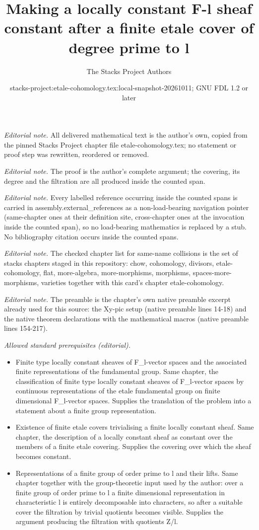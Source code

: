 \documentclass[10pt,a4paper]{amsart}
\title{Making a locally constant F-l sheaf constant after a finite etale cover of degree prime to l}
\author{The Stacks Project Authors}
\date{stacks-project:etale-cohomology.tex:local-snapshot-20261011; GNU FDL 1.2 or later}
\theoremstyle{plain}
\theoremstyle{definition}
\theoremstyle{remark}
\numberwithin{equation}{subsection}
\begin{document}
\maketitle
\noindent\textit{Editorial note.} All delivered mathematical text is the author's own, copied from the pinned Stacks Project chapter file etale-cohomology.tex; no statement or proof step was rewritten, reordered or removed.\par\medskip
\noindent\textit{Editorial note.} The proof is the author's complete argument; the covering, its degree and the filtration are all produced inside the counted span.\par\medskip
\noindent\textit{Editorial note.} Every labelled reference occurring inside the counted spans is carried in assembly.external\_references as a non-load-bearing navigation pointer (same-chapter ones at their definition site, cross-chapter ones at the invocation inside the counted span), so no load-bearing mathematics is replaced by a stub. No bibliography citation occurs inside the counted spans.\par\medskip
\noindent\textit{Editorial note.} The checked chapter list for same-name collisions is the set of stacks chapters staged in this repository: chow, cohomology, divisors, etale-cohomology, flat, more-algebra, more-morphisms, morphisms, spaces-more-morphisms, varieties together with this card's chapter etale-cohomology.\par\medskip
\noindent\textit{Editorial note.} The preamble is the chapter's own native preamble excerpt already used for this source: the Xy-pic setup (native preamble lines 14-18) and the native theorem declarations with the mathematical macros (native preamble lines 154-217).\par\medskip
\noindent\textit{Allowed standard prerequisites (editorial).}\begin{itemize}
\item Finite type locally constant sheaves of F\_l-vector spaces and the associated finite representations of the fundamental group. Same chapter, the classification of finite type locally constant sheaves of F\_l-vector spaces by continuous representations of the etale fundamental group on finite dimensional F\_l-vector spaces. Supplies the translation of the problem into a statement about a finite group representation.
\item Existence of finite etale covers trivialising a finite locally constant sheaf. Same chapter, the description of a locally constant sheaf as constant over the members of a finite etale covering. Supplies the covering over which the sheaf becomes constant.
\item Representations of a finite group of order prime to l and their lifts. Same chapter together with the group-theoretic input used by the author: over a finite group of order prime to l a finite dimensional representation in characteristic l is entirely decomposable into characters, so after a suitable cover the filtration by trivial quotients becomes visible. Supplies the argument producing the filtration with quotients Z/l.
\end{itemize}\medskip
\end{document}
